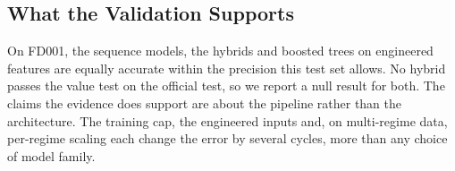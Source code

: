 \subsection{What the Validation Supports}
On FD001, the sequence models, the hybrids and boosted trees on engineered
features are equally accurate within the precision this test set allows.
No hybrid passes the value test on the official test, so we report a null
result for both. The claims the evidence does support are about the
pipeline rather than the architecture. The training cap, the engineered
inputs and, on multi-regime data, per-regime scaling each change the error by
several cycles, more than any choice of model family.

